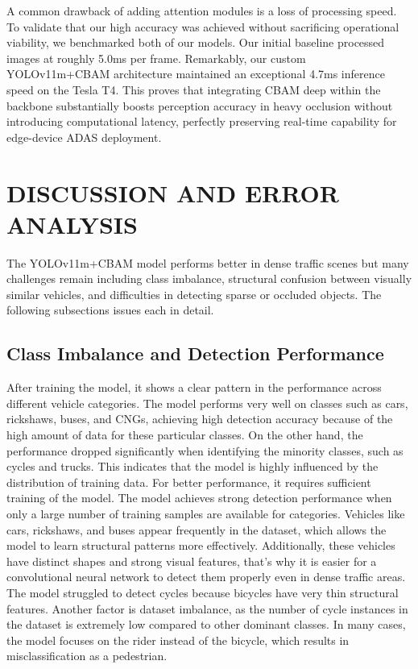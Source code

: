 \documentclass[conference]{IEEEtran}
\begin{document}
A common drawback of adding attention modules is a loss of processing speed. To validate that our high accuracy was achieved without sacrificing operational viability, we benchmarked both of our models. Our initial baseline processed images at roughly 5.0ms per frame. Remarkably, our custom YOLOv11m+CBAM architecture maintained an exceptional 4.7ms inference speed on the Tesla T4. This proves that integrating CBAM deep within the backbone substantially boosts perception accuracy in heavy occlusion without introducing computational latency, perfectly preserving real-time capability for edge-device ADAS deployment.

\section{DISCUSSION AND ERROR ANALYSIS}
The YOLOv11m+CBAM model performs better in dense traffic scenes but many challenges remain including class imbalance, structural confusion between visually similar vehicles, and difficulties in detecting sparse or occluded objects. The following subsections issues each in detail.

\subsection{Class Imbalance and Detection Performance}

After training the model, it shows a clear pattern in the performance across different vehicle categories. The model performs very well on classes such as cars, rickshaws, buses, and CNGs, achieving high detection accuracy because of the high amount of data for these particular classes. On the other hand, the performance dropped significantly when identifying the minority classes, such as cycles and trucks. This indicates that the model is highly influenced by the distribution of training data. For better performance, it requires sufficient training of the model. The model achieves strong detection performance when only a large number of training samples are available for categories. Vehicles like cars, rickshaws, and buses appear frequently in the dataset, which allows the model to learn structural patterns more effectively. Additionally, these vehicles have distinct shapes and strong visual features, that's why it is easier for a convolutional neural network to detect them properly even in dense traffic areas. The model struggled to detect cycles because bicycles have very thin structural features. Another factor is dataset imbalance, as the number of cycle instances in the dataset is extremely low compared to other dominant classes. In many cases, the model focuses on the rider instead of the bicycle, which results in misclassification as a pedestrian.
\end{document}

